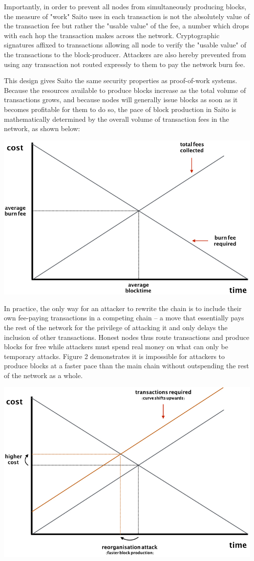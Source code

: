 \documentclass[11.5pt, oneside]{article}   	%
\begin{document}
\begin{multicols}{2}
Importantly, in order to prevent all nodes from simultaneously producing blocks, the measure of "work" Saito uses in each transaction is not the absolutely value of the transaction fee but rather the "usable value" of the fee, a number which drops with each hop the transaction makes across the network. Cryptographic signatures affixed to transactions allowing all node to verify the "usable value" of the transactions to the block-producer. Attackers are also hereby prevented from using any transaction not routed expressly to them to pay the network burn fee.

This design gives Saito the same security properties as proof-of-work systems. Because the resources available to produce blocks increase as the total volume of transactions grows, and because nodes will generally issue blocks as soon as it becomes profitable for them to do so, the pace of block production in Saito is mathematically determined by the overall volume of transaction fees in the network, as shown below:

\includegraphics[width=.45\textwidth]{saito2.jpeg}

In practice, the only way for an attacker to rewrite the chain is to include their own fee-paying transactions in a competing chain -- a move that essentially pays the rest of the network for the privilege of attacking it and only delays the inclusion of other transactions. Honest nodes thus route transactions and produce blocks for free while attackers must spend real money on what can only be temporary attacks. Figure 2 demonstrates it is impossible for attackers to produce blocks at a faster pace than the main chain without outspending the rest of the network as a whole.

\includegraphics[width=.45\textwidth]{saito3.jpeg}


\end{multicols}
\end{document}

